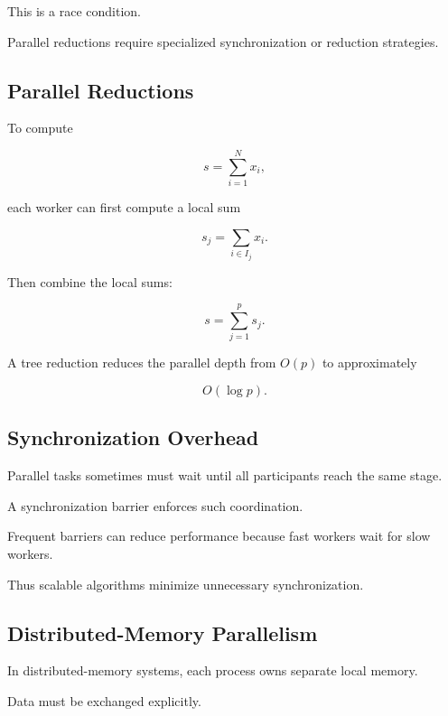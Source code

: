 This is a race condition.

Parallel reductions require specialized synchronization or reduction
strategies.

\subsection{Parallel Reductions}
\label{subsec:hpmc-parallel-reductions}

To compute

\[
s
=
\sum_{i=1}^{N}
x_i,
\]

each worker can first compute a local sum

\[
\boxed{
s_j
=
\sum_{i\in I_j}
x_i.
}
\]

Then combine the local sums:

\[
\boxed{
s
=
\sum_{j=1}^{p}
s_j.
}
\]

A tree reduction reduces the parallel depth from \(O(p)\) to approximately

\[
\boxed{
O(\log p).
}
\]

\subsection{Synchronization Overhead}
\label{subsec:hpmc-synchronization-overhead}

Parallel tasks sometimes must wait until all participants reach the same
stage.

A synchronization barrier enforces such coordination.

Frequent barriers can reduce performance because fast workers wait for
slow workers.

Thus scalable algorithms minimize unnecessary synchronization.

\subsection{Distributed-Memory Parallelism}
\label{subsec:hpmc-distributed-memory}

In distributed-memory systems, each process owns separate local memory.

Data must be exchanged explicitly.

